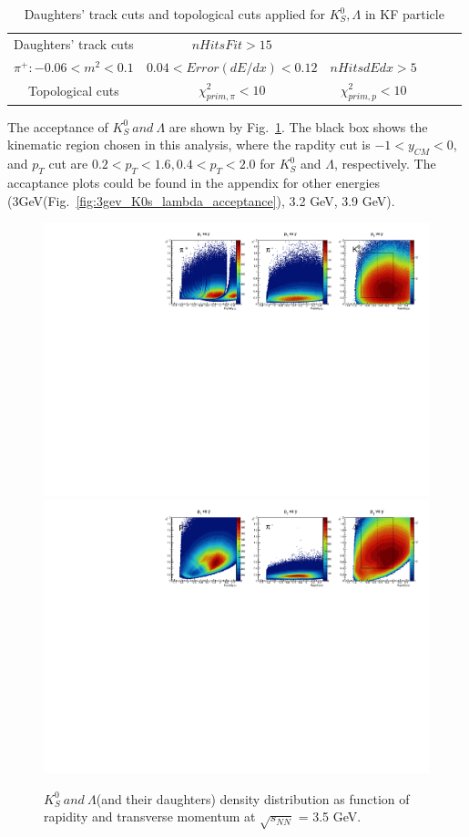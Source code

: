 \begin{table}
    \centering
    \begin{tabular}{|c|c|c|l|l|l|} \hline 
         Daughters' track cuts&  $nHitsFit > 15$ &\makecell{$|n\sigma_{\pi,p}-shift| < 3$, \\$\pi^{+}: -0.06 < m^2 < 0.1$}&$0.04 < Error(dE/dx ) < 0.12$ &$nHitsdEdx > 5$\\ \hline 
         Topological cuts&  $\chi^2_{prim, \pi}<10$&   $\chi^2_{prim, p}<10$& &\\ \hline
    \end{tabular}
    \caption{Daughters' track cuts and topological cuts applied for $K^{0}_{S}, \Lambda$ in KF particle}
    \label{tab:K0s_lam_cut}
\end{table}
The acceptance of $K^{0}_{S}~and~\Lambda$ are shown by Fig.~\ref{fig:3p5_K0s_lambda_acceptance}. 
The black box shows the kinematic region chosen in this analysis, where the rapdity cut is $-1<y_{CM}<0$, 
and $p_T$ cut are $0.2<p_T<1.6, 0.4<p_T<2.0$ for $K^{0}_{S}$ and $\Lambda$, respectively.
The accaptance plots could be found in the appendix for other energies (3GeV(Fig.~\ref{fig:3gev_K0s_lambda_acceptance}), 3.2 GeV, 3.9 GeV).



\begin{figure}[hbt!]
\centering
\includegraphics[width=0.55\linewidth]{figures/chapter02/3p5gev_K0s_acceptance.pdf}
\includegraphics[width=0.55\linewidth]{figures/chapter02/3p5gev_lambda_acceptance.pdf}
\caption{$K^{0}_{S}~and~\Lambda$(and their daughters) density distribution as function of rapidity and transverse momentum at $\sqrt{s_{NN}}$ = 3.5 GeV.}
\label{fig:3p5_K0s_lambda_acceptance}
\end{figure}



